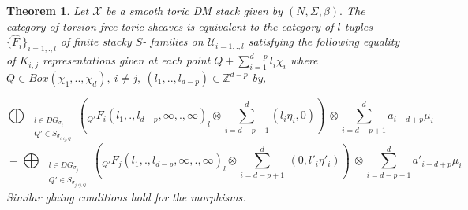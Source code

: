 \documentclass[10pt,a4paper]{amsart}
\newtheorem{thm}{Theorem}
\newcommand{\sX}{{\mathcal X}}
\begin{document}
\begin{thm}\label{Gluing Formula}
Let $\sX$ be a smooth toric DM stack given by $(N,\Sigma,\beta).$ 
The category of torsion free toric sheaves is equivalent to the category of $l$-tuples $\{\hat{F}_i\}_{i=1,.,l}$ of finite stacky $S$- families on $\mathscr{U}_{i=1,.,l}$ satisfying the following equality of $K_{i,j}$ representations given at each point $Q+\sum_{i=1}^{d-p}l_i\chi_i$ where $Q\in Box(\chi_1,..,\chi_d),\ i\neq j, \ (l_1,..,l_{d-p})\in \mathbb{Z}^{d-p}$ by,

$$\bigoplus_{\begin{array}{cc}
     &  l\in DG_{\sigma_i}\\
     & Q'\in S_{\sigma_{i,ij,Q}}
\end{array}} ({}_{Q'}F_{i}(l_1,.,l_{d-p},\infty,.,\infty)_{l} \otimes\sum_{i=d-p+1}^{d}(l_{i}\eta_{i},0))\ \otimes\sum_{i=d-p+1}^{d}a_{i-d+p}\mu_{i}$$
$$=\bigoplus_{{\begin{array}{cc}
     &  l\in DG_{\sigma_j}\\
     & Q'\in S_{\sigma_{j,ij,Q}}
\end{array}}}({}_{Q'}F_{j}(l_1,.,l_{d-p},\infty,.,\infty)_{l}\otimes\sum_{i=d-p+1}^{d}\ (0,l'_i\eta'_i))\ \otimes \sum_{i=d-p+1}^{d}a'_{i-d+p}\mu_{i}\ $$
Similar gluing conditions hold for the morphisms.
\end{thm}
\end{document}
